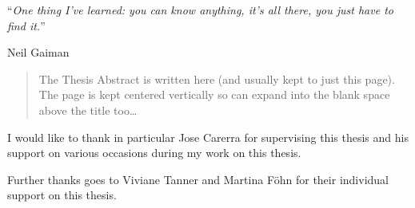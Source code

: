 \documentclass[
11pt, %
english, %
singlespacing, %
headsepline, %
]{MastersDoctoralThesis} %
\begin{document}
\vspace*{0.2\textheight}

\noindent\enquote{\itshape One thing I've learned: you can know anything, it's all there, you just have to find it.}\bigbreak

\hfill Neil Gaiman


\begin{abstract}
\addchaptertocentry{\abstractname} %

The Thesis Abstract is written here (and usually kept to just this page). The page is kept centered vertically so can expand into the blank space above the title too\ldots

\end{abstract}


\begin{acknowledgements}
\addchaptertocentry{\acknowledgementname} %

\noindent I would like to thank in particular Jose Carerra for supervising this thesis and his support on various occasions during my work on this thesis.

Further thanks goes to Viviane Tanner and Martina Föhn for their individual support on this thesis.

\end{acknowledgements}


\tableofcontents %

\listoffigures %

\listoftables %

\end{document}
